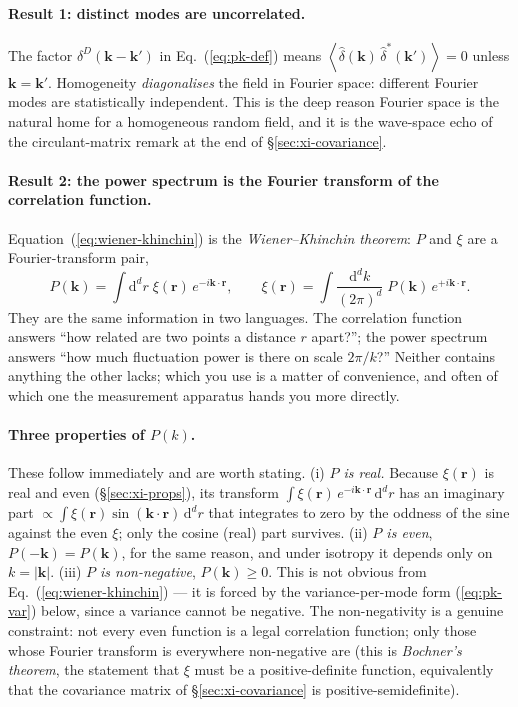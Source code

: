 \documentclass[12pt]{article}
\newcommand{\bk}{\mathbf{k}}
\newcommand{\br}{\mathbf{r}}
\newcommand{\avg}[1]{\left\langle #1 \right\rangle}
\begin{document}
\paragraph{Result 1: distinct modes are uncorrelated.}
The factor $\delta^D(\bk - \bk')$ in Eq.~(\ref{eq:pk-def}) means
$\avg{\hat\delta(\bk)\,\hat\delta^*(\bk')} = 0$ unless $\bk = \bk'$.
Homogeneity \emph{diagonalises} the field in Fourier space: different
Fourier modes are statistically independent.  This is the deep reason
Fourier space is the natural home for a homogeneous random field, and
it is the wave-space echo of the circulant-matrix remark at the end of
\S\ref{sec:xi-covariance}.

\paragraph{Result 2: the power spectrum is the Fourier transform of the
correlation function.}  Equation~(\ref{eq:wiener-khinchin}) is the
\emph{Wiener--Khinchin theorem}: $P$ and $\xi$ are a Fourier-transform
pair,
\begin{equation}
  P(\bk) = \int \mathrm d^d r\;\xi(\br)\,e^{-i\bk\cdot\br},
  \qquad
  \xi(\br) = \int \frac{\mathrm d^d k}{(2\pi)^d}\;P(\bk)\,e^{+i\bk\cdot\br}.
  \label{eq:P-xi-pair}
\end{equation}
They are the same information in two languages.  The correlation
function answers ``how related are two points a distance $r$ apart?'';
the power spectrum answers ``how much fluctuation power is there on
scale $2\pi/k$?''  Neither contains anything the other lacks; which you
use is a matter of convenience, and often of which one the measurement
apparatus hands you more directly.

\paragraph{Three properties of $P(k)$.}  These follow immediately and are
worth stating.  (i) \emph{$P$ is real.}  Because $\xi(\br)$ is real and
even (\S\ref{sec:xi-props}), its transform
$\int \xi(\br)\,e^{-i\bk\cdot\br}\,\mathrm d^d r$ has an imaginary part
$\propto \int \xi(\br)\sin(\bk\cdot\br)\,\mathrm d^d r$ that integrates to
zero by the oddness of the sine against the even $\xi$; only the cosine
(real) part survives.  (ii) \emph{$P$ is even}, $P(-\bk) = P(\bk)$, for
the same reason, and under isotropy it depends only on $k = |\bk|$.
(iii) \emph{$P$ is non-negative}, $P(\bk) \ge 0$.  This is not obvious
from Eq.~(\ref{eq:wiener-khinchin}) --- it is forced by the
variance-per-mode form (\ref{eq:pk-var}) below, since a variance cannot
be negative.  The non-negativity is a genuine constraint: not every even
function is a legal correlation function; only those whose Fourier
transform is everywhere non-negative are (this is \emph{Bochner's
theorem}, the statement that $\xi$ must be a positive-definite function,
equivalently that the covariance matrix of \S\ref{sec:xi-covariance} is
positive-semidefinite).
\end{document}
